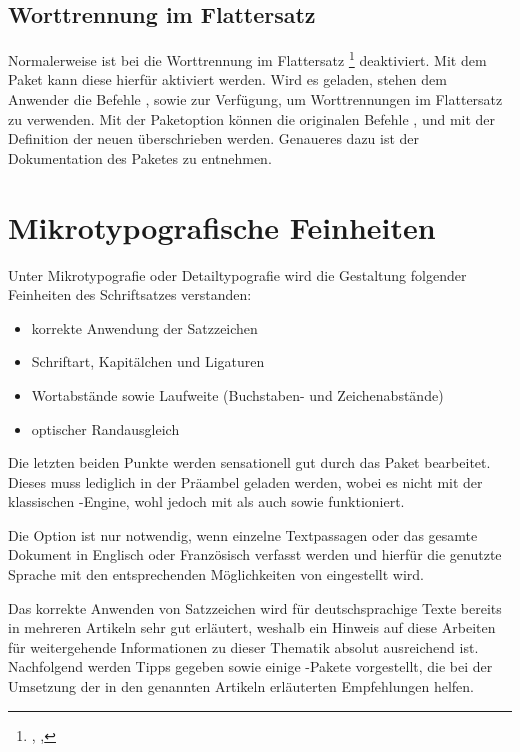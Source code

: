 \documentclass[%
  english,ngerman,%
  cdgeometry=no,DIV=12,automark,%
]{tudscrartcl}
\begin{document}
\subsection{Worttrennung im Flattersatz}
Normalerweise ist bei  die Worttrennung im Flattersatz%
\footnote{, , } deaktiviert. 
Mit dem Paket  kann diese hierfür aktiviert werden. Wird es 
geladen, stehen dem Anwender die Befehle ,  
sowie  zur Verfügung, um Worttrennungen im Flattersatz zu 
verwenden. Mit der Paketoption  können die originalen 
Befehle ,  und  mit der 
Definition der neuen überschrieben werden. Genaueres dazu ist der Dokumentation 
des Paketes zu entnehmen.



\section{Mikrotypografische Feinheiten}
Unter Mikrotypografie oder Detailtypografie wird die Gestaltung folgender 
Feinheiten des Schriftsatzes verstanden:
\begin{itemize}[noitemsep]
\item korrekte Anwendung der Satzzeichen
\item Schriftart, Kapitälchen und Ligaturen
\item Wortabstände sowie Laufweite (Buchstaben- und Zeichenabstände)
\item optischer Randausgleich
\end{itemize}

\noindent Die letzten beiden Punkte werden sensationell gut durch das Paket 
 bearbeitet. Dieses muss lediglich in der Präambel geladen 
werden, wobei es nicht mit der klassischen -Engine, wohl jedoch mit 
 als auch  sowie  funktioniert.
%
\begin{Preamble}
\usepackage[babel]{microtype}

\end{Preamble}
%
Die Option  ist nur notwendig, wenn einzelne Textpassagen oder 
das gesamte Dokument in Englisch oder Französisch verfasst werden und hierfür 
die genutzte Sprache mit den entsprechenden Möglichkeiten von  
eingestellt wird.

Das korrekte Anwenden von Satzzeichen wird für deutschsprachige Texte bereits 
in mehreren Artikeln \cite{neubauer1996,neubauer1997,struckmann2007,bier2009} 
sehr gut erläutert, weshalb ein Hinweis auf diese Arbeiten für weitergehende 
Informationen zu dieser Thematik absolut ausreichend ist. Nachfolgend werden 
Tipps gegeben sowie einige -Pakete vorgestellt, die bei der 
Umsetzung der in den genannten Artikeln erläuterten Empfehlungen helfen.
\end{document}
